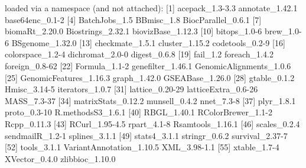 \documentclass[11pt]{article}
\begin{document}
\begin{Schunk}
\begin{Soutput}
loaded via a namespace (and not attached):
 [1] acepack_1.3-3.3          annotate_1.42.1          base64enc_0.1-2         
 [4] BatchJobs_1.5            BBmisc_1.8               BiocParallel_0.6.1      
 [7] biomaRt_2.20.0           Biostrings_2.32.1        biovizBase_1.12.3       
[10] bitops_1.0-6             brew_1.0-6               BSgenome_1.32.0         
[13] checkmate_1.5.1          cluster_1.15.2           codetools_0.2-9         
[16] colorspace_1.2-4         dichromat_2.0-0          digest_0.6.8            
[19] fail_1.2                 foreach_1.4.2            foreign_0.8-62          
[22] Formula_1.1-2            genefilter_1.46.1        GenomicAlignments_1.0.6 
[25] GenomicFeatures_1.16.3   graph_1.42.0             GSEABase_1.26.0         
[28] gtable_0.1.2             Hmisc_3.14-5             iterators_1.0.7         
[31] lattice_0.20-29          latticeExtra_0.6-26      MASS_7.3-37             
[34] matrixStats_0.12.2       munsell_0.4.2            nnet_7.3-8              
[37] plyr_1.8.1               proto_0.3-10             R.methodsS3_1.6.1       
[40] RBGL_1.40.1              RColorBrewer_1.1-2       Rcpp_0.11.3             
[43] RCurl_1.95-4.5           rpart_4.1-8              Rsamtools_1.16.1        
[46] scales_0.2.4             sendmailR_1.2-1          splines_3.1.1           
[49] stats4_3.1.1             stringr_0.6.2            survival_2.37-7         
[52] tools_3.1.1              VariantAnnotation_1.10.5 XML_3.98-1.1            
[55] xtable_1.7-4             XVector_0.4.0            zlibbioc_1.10.0         
\end{Soutput}
\end{Schunk}

\newpage

\vspace{2cm}
\end{document}
